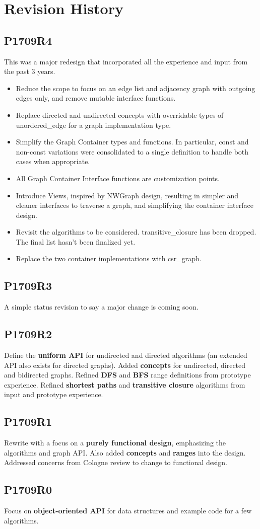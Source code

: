 \chapter*{Revision History}
\section*{P1709R4}
This was a major redesign that incorporated all the experience and input from the past 3 years.
\begin{itemize}
\item Reduce the scope to focus on an edge list and adjacency graph with outgoing edges only, and remove mutable interface functions. 
\item Replace directed and undirected concepts with overridable types of unordered\_edge for a graph implementation type.
\item Simplify the Graph Container types and functions. In particular, const and non-const variations were consolidated to a single definition to handle both cases 
when appropriate.
\item All Graph Container Interface functions are customization points.
\item Introduce Views, inspired by NWGraph design, resulting in simpler and cleaner interfaces to traverse a graph, and simplifying the container interface design.
\item Revisit the algorithms to be considered. transitive\_closure has been dropped. The final list hasn't been finalized yet.
\item Replace the two container implementations with csr\_graph.
\end{itemize}

\section*{P1709R3}
A simple status revision to say a major change is coming soon.

\section*{P1709R2}
Define the \textbf{uniform API} for undirected and directed algorithms (an extended API also exists for directed graphs). Added \textbf{concepts} for undirected, directed and bidirected graphs. Refined \textbf{DFS} and \textbf{BFS} range definitions from prototype experience. Refined \textbf{shortest paths} and \textbf{transitive closure} algorithms from input and prototype experience.

\section*{P1709R1}
Rewrite with a focus on a \textbf{purely functional design}, emphasizing the algorithms and graph API. Also added \textbf{concepts} and \textbf{ranges} into the design. Addressed concerns from Cologne review to change to functional design.

\section*{P1709R0}
Focus on \textbf{object-oriented API} for data structures and example code for a few algorithms.

